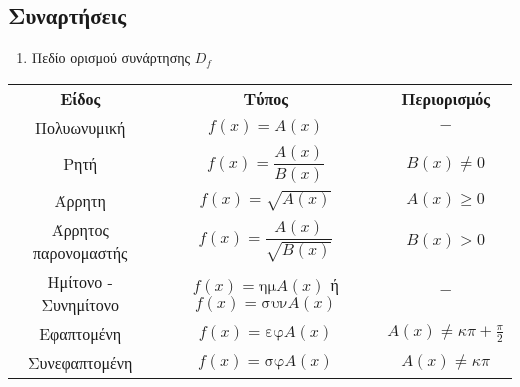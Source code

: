 \documentclass[a4paper,11pt]{article}
\newcommand{\hm}[1]{\textrm{ημ}#1}
\newcommand{\syn}[1]{\textrm{συν}#1}
\newcommand{\ef}[1]{\textrm{εφ}#1}
\newcommand{\syf}[1]{\textrm{σφ}#1}
\begin{document}
\subsection{Συναρτήσεις}
\begin{enumerate}[label=\thesection.\arabic*]
\item Πεδίο ορισμού συνάρτησης $D_f$
\end{enumerate}
\begin{center}
\begin{tabular}{ccc}
\hline 
\rule[-2ex]{0pt}{5ex} \textbf{Είδος} & \textbf{Τύπος} & \textbf{Περιορισμός} \\ \hhline{===} 
\rule[-2ex]{0pt}{5ex} Πολυωνυμική & 
 $ f(x)=A(x) $ & $ - $ \\
\rule[-2ex]{0pt}{5ex} Ρητή & 
 $ f(x)=\dfrac{A(x)}{B(x)} $ & $ B(x)\neq 0 $ \\ \rule[-2ex]{0pt}{5ex} Άρρητη & 
 $ f(x)=\sqrt{A(x)} $ & $ A(x)\geq 0 $ \\
\rule[-2ex]{0pt}{5ex} Άρρητος παρονομαστής & 
$ f(x)=\dfrac{A(x)}{\sqrt{B(x)}} $ & $ B(x)>0 $ \\
\rule[-2ex]{0pt}{5ex} Ημίτονο - Συνημίτονο & 
$ f(x)=\hm{A(x)} $ ή $f(x)=\syn{A(x)}$ & $ - $ \\
\rule[-2ex]{0pt}{5ex} Εφαπτομένη & 
$ f(x)=\ef{A(x)} $ & $ A(x)\neq \kappa\pi+\frac{\pi}{2} $ \\
\rule[-2ex]{0pt}{5ex} Συνεφαπτομένη & 
$ f(x)=\syf{A(x)} $ & $ A(x)\neq\kappa\pi $ \\
\hline 
\end{tabular}\label{pinakas}
\end{center}
\end{document}
